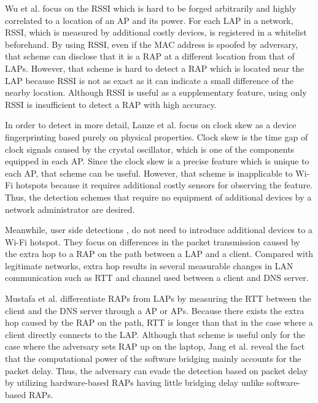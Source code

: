 \documentclass[conference]{IEEEtran}
\begin{document}
Wu et al. \cite{prapd} focus on the RSSI which is hard to be forged arbitrarily and highly correlated to a location of an AP and its power.
For each LAP in a network, RSSI, which is measured by additional costly devices, is registered in a whitelist beforehand.
By using RSSI, even if the MAC address is spoofed by adversary, that scheme can disclose that it is a RAP at a different location from that of LAPs.
However, that scheme is hard to detect a RAP which is located near the LAP because RSSI is not as exact as it can indicate a small difference of the nearby location.
Although RSSI is useful as a supplementary feature, using only RSSI is insufficient to detect a RAP with high accuracy.

In order to detect in more detail, Lanze et al. \cite{clockskew} focus on clock skew as a device fingerprinting based purely on physical properties.
Clock skew is the time gap of clock signals caused by the crystal oscillator, which is one of the components equipped in each AP.
Since the clock skew is a precise feature which is unique to each AP, that scheme can be useful.
However, that scheme is inapplicable to Wi-Fi hotspots because it requires additional costly sensors for observing the feature.
Thus, the detection schemes that require no equipment of additional devices by a network administrator are desired.

Meanwhile, user side detections \cite{rtt}, \cite{previous} do not need to introduce additional devices to a Wi-Fi hotspot.
They focus on differences in the packet transmission caused by the extra hop to a RAP on the path between a LAP and a client.
Compared with legitimate networks, extra hop results in several measurable changes in LAN communication such as RTT and channel used between a client and DNS server.

Mustafa et al. \cite{rtt} differentiate RAPs from LAPs by measuring the RTT between the client and the DNS server through a AP or APs.
Because there exists the extra hop caused by the RAP on the path, RTT is longer than that in the case where a client directly connects to the LAP.
Although that scheme is useful only for the case where the adversary sets RAP up on the laptop, Jang et al. \cite{previous} reveal the fact that the computational power of the software bridging mainly accounts for the packet delay.
Thus, the adversary can evade the detection based on packet delay by utilizing hardware-based RAPs having little bridging delay unlike software-based RAPs.
\end{document}
